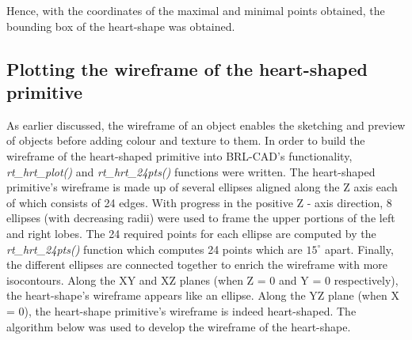 Hence, with the coordinates of the maximal and minimal points obtained, the bounding box of the heart-­shape was obtained.

\subsection{Plotting the wireframe of the heart-­shaped primitive}

\hspace{30} As  earlier   discussed,   the   wireframe   of   an   object   enables   the  
sketching   and   preview   of   objects   before   adding   colour   and   texture   to   them.   In  
order   to   build   the   wireframe   of   the   heart-­shaped   primitive   into   BRL-­CAD's  
functionality, \textit{rt\_hrt\_plot()}   and   \textit{rt\_hrt\_24pts()}   functions were written.   The  
heart-­shaped   primitive's   wireframe   is   made   up   of   several   ellipses   aligned   along  
the   Z   axis   each   of   which   consists   of   24   edges. With  progress   in   the   positive  
 Z - ­axis   direction,   8   ellipses   (with   decreasing   radii) were used  to   frame   the   upper  
portions   of   the   left   and   right   lobes.   The   24   required   points   for   each   ellipse   are  
computed   by   the   \textit{rt\_hrt\_24pts()} function which computes 24 points which are $15^{\circ}$ apart.
Finally,   the   different   ellipses   are  connected   together   to   enrich   the   wireframe   
with   more   iso­contours.   Along   the  XY   and   XZ   planes   (when   Z   =   0   and   Y   =   0   respectively), the   heart-­shape's  wireframe   appears   like   an   ellipse.   Along   the   YZ   plane   (when   X   =   0),   the  
heart-­shape   primitive's   wireframe   is   indeed   heart­-shaped.   The   algorithm   below  
was used to develop the wireframe of the heart­-shape.  

